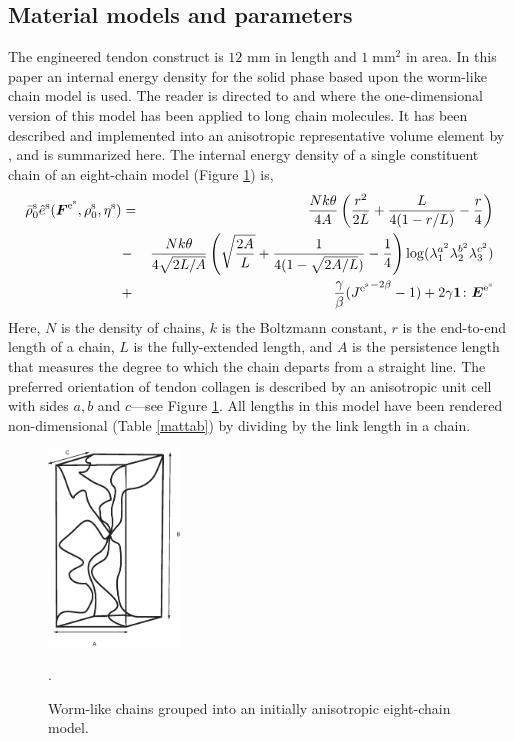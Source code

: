 \subsection{Material models and parameters}\label{sect6.1}

The engineered tendon construct is $12$ mm in length and
$1\;\mathrm{mm}^2$ in area. In this paper an internal energy
density for the solid phase based upon the worm-like chain model
is used. The reader is directed to \citet{Riefetal:97} and
\cite{Bustamanteetal:2003} where the one-dimensional version of
this model has been applied to long chain molecules. It has been
described and implemented into an anisotropic representative
volume element by \citet{Bischoffetal:2002}, and is summarized
here. The internal energy density of a single constituent chain of
an eight-chain model (Figure \ref{eightchain}) is,
\begin{eqnarray}
\bar{\rho}_0^\mathrm{s}\hat{e}^\mathrm{s}(\mbox{\boldmath$ F$}^{\mathrm{e}^\mathrm{s}},\rho_0^\mathrm{s},\eta^\mathrm{s})
&=& \frac{N k \theta}{4 A}\left(\frac{r^2}{2L} +
\frac{L}{4(1-r/L)} -
\frac{r}{4}\right)\nonumber\\
&-&\frac{N k \theta}{4\sqrt{2L/A}}\left(\sqrt{\frac{2A}{L}} +
\frac{1}{4(1 - \sqrt{2A/L})} -\frac{1}{4} \right)\log(\lambda_1^{a^2}\lambda_2^{b^2}\lambda_3^{c^2})\nonumber\\
&+& \frac{\gamma}{\beta}({J^{\mathrm{e}^\mathrm{s}}}^{-2\beta} -1)
+ 2\gamma{\bf 1}\colon\mbox{\boldmath$ E$}^{\mathrm{e}^\mathrm{s}} \label{wlcmeq}
\end{eqnarray}
\noindent Here, $N$ is the density of chains, $k$ is the Boltzmann
constant, $r$ is the end-to-end length of a chain, $L$ is the
fully-extended length, and $A$ is the persistence length that
measures the degree to which the chain departs from a straight
line. The preferred orientation of tendon collagen is described by
an anisotropic unit cell with sides $a,b$ and $c$---see Figure
\ref{eightchain}. All lengths in this model have been rendered
non-dimensional (Table \ref{mattab}) by dividing by the link
length in a chain.
\begin{figure}[ht]
   \centering
{\includegraphics[width=3.5cm]{images/wlcm.eps}} \caption{Worm-like
chains grouped into an initially anisotropic eight-chain model.}
\label{eightchain}.
\end{figure}

